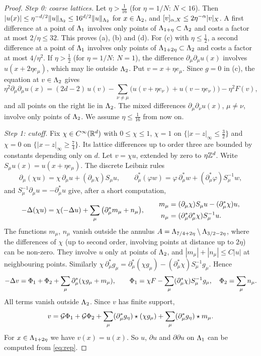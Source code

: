 \begin{proof}
\emph{Step 0: coarse lattices.} Let $\eta>\frac1{16}$ (for $\eta=1/N$: $N<16$). Then $|u(x)|\le\eta^{-d/2}\|u\|_{\Lambda_2}\le16^{d/2}\|u\|_{\Lambda_2}$ for $x\in\Lambda_2$, and $[v]_{\alpha,X}\le2\eta^{-\alpha}|v|_X$. A first difference at a point of $\Lambda_1$ involves only points of $\Lambda_{1+\eta}\subset\Lambda_2$ and costs a factor at most $2/\eta\le32$. This proves (a), (b) and (d). For (c) with $\eta\le\frac12$, a second difference at a point of $\Lambda_1$ involves only points of $\Lambda_{1+2\eta}\subset\Lambda_2$ and costs a factor at most $4/\eta^2$. If $\eta>\frac12$ (for $\eta=1/N$: $N=1$), the difference $\partial_\mu\partial_\mu u(x)$ involves $u(x+2\eta e_\mu)$, which may lie outside $\Lambda_2$. Put $v=x+\eta e_\mu$. Since $g=0$ in (c), the equation at $v\in\Lambda_2$ gives
\[
\eta^2\partial_\mu\partial_\mu u(x)=(2d-2)\,u(v)-\sum_{\nu\ne\mu}\big(u(v+\eta e_\nu)+u(v-\eta e_\nu)\big)-\eta^2F(v),
\]
and all points on the right lie in $\Lambda_2$. The mixed differences $\partial_\mu\partial_\nu u(x)$, $\mu\ne\nu$, involve only points of $\Lambda_2$. We assume $\eta\le\frac1{16}$ from now on.

\emph{Step 1: cutoff.} Fix $\chi\in C^\infty(\mathbb R^d)$ with $0\le\chi\le1$, $\chi=1$ on $\{|x-z|_\infty\le\frac32\}$ and $\chi=0$ on $\{|x-z|_\infty\ge\frac74\}$. Its lattice differences up to order three are bounded by constants depending only on $d$. Let $v=\chi u$, extended by zero to $\eta\mathbb Z^d$. Write $S_\mu u(x)=u(x+\eta e_\mu)$. The discrete Leibniz rules
\[
\partial_\mu(\chi u)=\chi\,\partial_\mu u+(\partial_\mu\chi)S_\mu u,\qquad
\partial_\mu^*(\varphi w)=\varphi\,\partial^*_\mu w+(\partial^*_\mu\varphi)S_\mu^{-1}w,
\]
and $S_\mu^{-1}\partial_\mu u=-\partial^*_\mu u$ give, after a short computation,
\begin{equation}\label{eq:commutator}
-\Delta(\chi u)=\chi(-\Delta u)+\sum_\mu\big(\partial^*_\mu m_\mu+n_\mu\big),\qquad
\begin{aligned}
m_\mu&=(\partial_\mu\chi)S_\mu u-(\partial^*_\mu\chi)u,\\
n_\mu&=(\partial^*_\mu\partial^*_\mu\chi)S_\mu^{-1}u .
\end{aligned}
\end{equation}
The functions $m_\mu$, $n_\mu$ vanish outside the annulus $A=\Lambda_{7/4+2\eta}\setminus\Lambda_{3/2-2\eta}$, where the differences of $\chi$ (up to second order, involving points at distance up to $2\eta$) can be non-zero. They involve $u$ only at points of $\Lambda_2$, and $|m_\mu|+|n_\mu|\le C|u|$ at neighbouring points. Similarly $\chi\,\partial^*_\mu g_\mu=\partial^*_\mu(\chi g_\mu)-(\partial^*_\mu\chi)S_\mu^{-1}g_\mu$. Hence
\[
-\Delta v=\Phi_1+\Phi_2+\sum_\mu\partial^*_\mu(\chi g_\mu+m_\mu),\qquad
\Phi_1=\chi F-\sum_\mu(\partial^*_\mu\chi)S^{-1}_\mu g_\mu,\quad \Phi_2=\sum_\mu n_\mu .
\]
All terms vanish outside $\Lambda_2$. Since $v$ has finite support,
\begin{equation}\label{eq:rep}
v=\mathcal G\Phi_1+\mathcal G\Phi_2+\sum_\mu(\partial^*_\mu g_\eta)\star(\chi g_\mu)+\sum_\mu(\partial^*_\mu g_\eta)\star m_\mu .
\end{equation}
For $x\in\Lambda_{1+2\eta}$ we have $v(x)=u(x)$. So $u$, $\partial u$ and $\partial\partial u$ on $\Lambda_1$ can be computed from \eqref{eq:rep}.


\end{proof}
